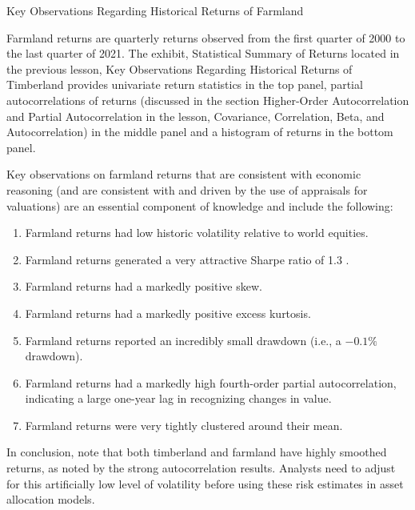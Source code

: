 \documentclass[11pt]{article}
\begin{document}
Key Observations Regarding Historical Returns of Farmland

Farmland returns are quarterly returns observed from the first quarter of 2000 to the last quarter of 2021. The exhibit, Statistical Summary of Returns located in the previous lesson, Key Observations Regarding Historical Returns of Timberland provides univariate return statistics in the top panel, partial autocorrelations of returns (discussed in the section Higher-Order Autocorrelation and Partial Autocorrelation in the lesson, Covariance, Correlation, Beta, and Autocorrelation) in the middle panel and a histogram of returns in the bottom panel.

Key observations on farmland returns that are consistent with economic reasoning (and are consistent with and driven by the use of appraisals for valuations) are an essential component of knowledge and include the following:

\begin{enumerate}
  \item Farmland returns had low historic volatility relative to world equities.

  \item Farmland returns generated a very attractive Sharpe ratio of 1.3 .

  \item Farmland returns had a markedly positive skew.

  \item Farmland returns had a markedly positive excess kurtosis.

  \item Farmland returns reported an incredibly small drawdown (i.e., a $-0.1 \%$ drawdown).

  \item Farmland returns had a markedly high fourth-order partial autocorrelation, indicating a large one-year lag in recognizing changes in value.

  \item Farmland returns were very tightly clustered around their mean.

\end{enumerate}

In conclusion, note that both timberland and farmland have highly smoothed returns, as noted by the strong autocorrelation results. Analysts need to adjust for this artificially low level of volatility before using these risk estimates in asset allocation models.
\end{document}
